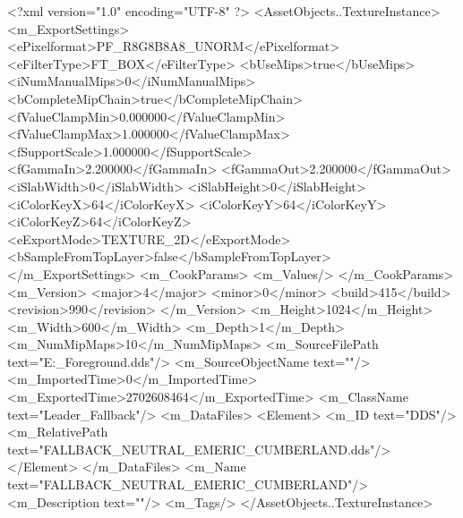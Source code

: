 <?xml version="1.0" encoding="UTF-8" ?>
<AssetObjects..TextureInstance>
	<m_ExportSettings>
		<ePixelformat>PF_R8G8B8A8_UNORM</ePixelformat>
		<eFilterType>FT_BOX</eFilterType>
		<bUseMips>true</bUseMips>
		<iNumManualMips>0</iNumManualMips>
		<bCompleteMipChain>true</bCompleteMipChain>
		<fValueClampMin>0.000000</fValueClampMin>
		<fValueClampMax>1.000000</fValueClampMax>
		<fSupportScale>1.000000</fSupportScale>
		<fGammaIn>2.200000</fGammaIn>
		<fGammaOut>2.200000</fGammaOut>
		<iSlabWidth>0</iSlabWidth>
		<iSlabHeight>0</iSlabHeight>
		<iColorKeyX>64</iColorKeyX>
		<iColorKeyY>64</iColorKeyY>
		<iColorKeyZ>64</iColorKeyZ>
		<eExportMode>TEXTURE_2D</eExportMode>
		<bSampleFromTopLayer>false</bSampleFromTopLayer>
	</m_ExportSettings>
	<m_CookParams>
		<m_Values/>
	</m_CookParams>
	<m_Version>
		<major>4</major>
		<minor>0</minor>
		<build>415</build>
		<revision>990</revision>
	</m_Version>
	<m_Height>1024</m_Height>
	<m_Width>600</m_Width>
	<m_Depth>1</m_Depth>
	<m_NumMipMaps>10</m_NumMipMaps>
	<m_SourceFilePath text="E:\Jordi\Escritorio\ModdingIcons\elderscrolls\LeaderPotraits\Emeric_Foreground.dds"/>
	<m_SourceObjectName text=""/>
	<m_ImportedTime>0</m_ImportedTime>
	<m_ExportedTime>2702608464</m_ExportedTime>
	<m_ClassName text="Leader_Fallback"/>
	<m_DataFiles>
		<Element>
			<m_ID text="DDS"/>
			<m_RelativePath text="FALLBACK_NEUTRAL_EMERIC_CUMBERLAND.dds"/>
		</Element>
	</m_DataFiles>
	<m_Name text="FALLBACK_NEUTRAL_EMERIC_CUMBERLAND"/>
	<m_Description text=""/>
	<m_Tags/>
</AssetObjects..TextureInstance>

